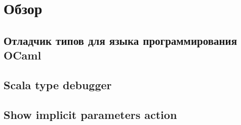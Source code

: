 \section{Обзор}

\subsection{Отладчик типов для языка программирования OCaml}
\subsection{Scala type debugger}
\subsection{Show implicit parameters action}
